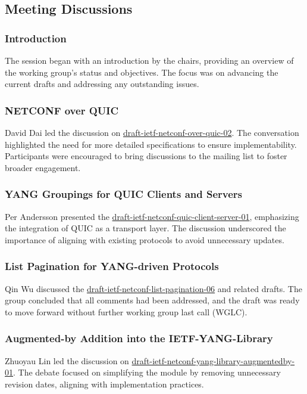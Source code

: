 \documentclass{article}
\begin{document}
\subsection{Meeting Discussions}

\subsubsection{Introduction}
The session began with an introduction by the chairs, providing an overview of the working group's status and objectives. The focus was on advancing the current drafts and addressing any outstanding issues.

\subsubsection{NETCONF over QUIC}
David Dai led the discussion on \href{https://datatracker.ietf.org/doc/html/draft-ietf-netconf-over-quic-02}{draft-ietf-netconf-over-quic-02}. The conversation highlighted the need for more detailed specifications to ensure implementability. Participants were encouraged to bring discussions to the mailing list to foster broader engagement.

\subsubsection{YANG Groupings for QUIC Clients and Servers}
Per Andersson presented the \href{https://datatracker.ietf.org/doc/html/draft-ietf-netconf-quic-client-server-01}{draft-ietf-netconf-quic-client-server-01}, emphasizing the integration of QUIC as a transport layer. The discussion underscored the importance of aligning with existing protocols to avoid unnecessary updates.

\subsubsection{List Pagination for YANG-driven Protocols}
Qin Wu discussed the \href{https://datatracker.ietf.org/doc/html/draft-ietf-netconf-list-pagination-06}{draft-ietf-netconf-list-pagination-06} and related drafts. The group concluded that all comments had been addressed, and the draft was ready to move forward without further working group last call (WGLC).

\subsubsection{Augmented-by Addition into the IETF-YANG-Library}
Zhuoyau Lin led the discussion on \href{https://datatracker.ietf.org/doc/html/draft-ietf-netconf-yang-library-augmentedby-01}{draft-ietf-netconf-yang-library-augmentedby-01}. The debate focused on simplifying the module by removing unnecessary revision dates, aligning with implementation practices.
\end{document}
